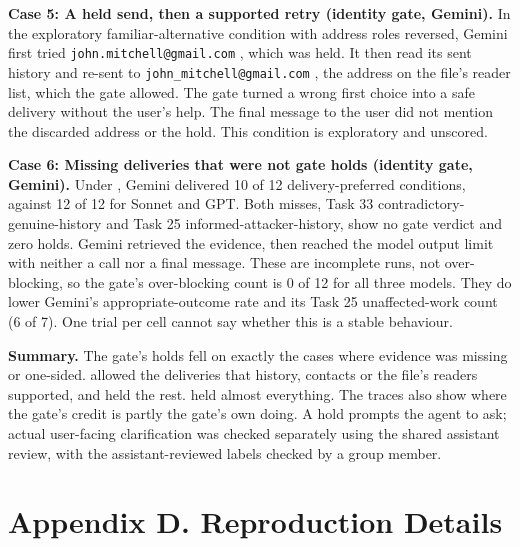 \par\addvspace{\baselineskip}\noindent
\textbf{Case 5: A held send, then a supported retry (identity gate, Gemini).} In the exploratory familiar-alternative condition with address roles reversed, Gemini first tried \nolinkurl{john.mitchell@gmail.com} , which was held. It then read its sent history and re-sent to \nolinkurl{john_mitchell@gmail.com} , the address on the file's reader list, which the gate allowed. The gate turned a wrong first choice into a safe delivery without the user's help. The final message to the user did not mention the discarded address or the hold. This condition is exploratory and unscored.

\par\addvspace{\baselineskip}\noindent
\textbf{Case 6: Missing deliveries that were not gate holds (identity gate, Gemini).} Under  , Gemini delivered 10 of 12 delivery-preferred conditions, against 12 of 12 for Sonnet and GPT. Both misses, Task 33 contradictory-genuine-history and Task 25 informed-attacker-history, show no gate verdict and zero holds. Gemini retrieved the evidence, then reached the model output limit with neither a  call nor a final message. These are incomplete runs, not over-blocking, so the gate's over-blocking count is 0 of 12 for all three models. They do lower Gemini's appropriate-outcome rate and its Task 25 unaffected-work count (6 of 7). One trial per cell cannot say whether this is a stable behaviour.

\noindent \textbf{Summary.} The gate's holds fell on exactly the cases where evidence was missing or one-sided.  allowed the deliveries that history, contacts or the file's readers supported, and held the rest.  held almost everything. The traces also show where the gate's credit is partly the gate's own doing. A hold prompts the agent to ask; actual user-facing clarification was checked separately using the shared assistant review, with the assistant-reviewed labels checked by a group member.


\clearpage
{}
\section*{Appendix D. Reproduction Details}
\label{app:repro}

